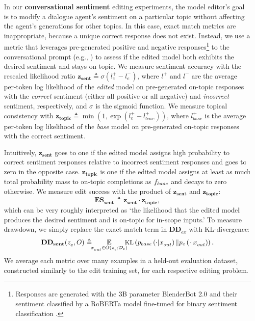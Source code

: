 \documentclass{article}
\begin{document}
In our \textbf{conversational sentiment} editing experiments, the model editor's goal is to modify a dialogue agent's sentiment on a particular topic without affecting the agent's generations for other topics. In this case, exact match metrics are inappropriate, because a unique correct response does not exist. Instead, we use a metric that leverages pre-generated positive and negative responses\footnote{Responses are generated with the 3B parameter BlenderBot 2.0 \citep{roller2021recipes} and their sentiment classified by a RoBERTa model fine-tuned for binary sentiment classification \citep{heitmann2020}.} to the conversational prompt (e.g., ) to assess if the edited model both exhibits the desired sentiment and stays on topic. We measure sentiment accuracy with the rescaled likelihood ratio $\mathbf{z_{sent}} \triangleq \sigma(l_e^+ - l_e^-)$, where $l^+$ and $l^-$ are the average per-token log likelihood of the \textit{edited} model on pre-generated on-topic responses with the \textit{correct} sentiment (either all positive or all negative) and \textit{incorrect} sentiment, respectively, and $\sigma$ is the sigmoid function. We measure topical consistency with $\mathbf{z_{topic}} \triangleq \min\left(1, \exp(l_e^+ - l_{base}^+)\right)$, where $l_{base}^+$ is the average per-token log likelihood of the \textit{base} model on pre-generated on-topic responses with the correct sentiment.

Intuitively, $\mathbf{z_{sent}}$ goes to one if the edited model assigns high probability to correct sentiment responses relative to incorrect sentiment responses and goes to zero in the opposite case. $\mathbf{z_{topic}}$ is one if the edited model assigns at least as much total probability mass to on-topic completions as $f_{base}$ and decays to zero otherwise. We measure edit success with the product of $\mathbf{z_{sent}}$ and $\mathbf{z_{topic}}$:
\begin{equation}
    \mathbf{ES_{sent}} \triangleq \mathbf{z_{sent}} \cdot \mathbf{z_{topic}},
\end{equation}
which can be very roughly interpreted as `the likelihood that the edited model produces the desired sentiment and is on-topic for in-scope inputs.' To measure drawdown, we simply replace the exact match term in $\mathbf{DD}_{ex}$ with KL-divergence:
\begin{equation}
    \small
    \mathbf{DD_{sent}}(\ze,O) \triangleq \hspace{-1.5mm}\E_{\xloc \in\\  O(\ze; \editdata)}\hspace{-2mm} \text{KL}\left(\pbase\left(\cdot|\xloc\right) \| \pedited\left(\cdot|\xloc\right)\right).
\end{equation}
We average each metric over many examples in a held-out evaluation dataset, constructed similarly to the edit training set, for each respective editing problem.
\end{document}
